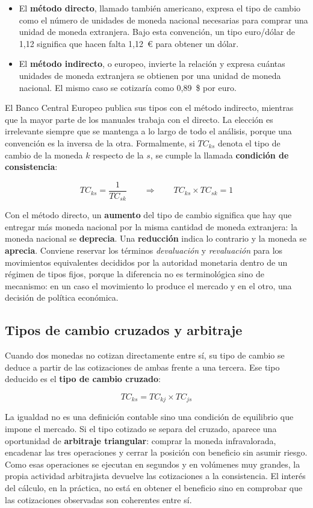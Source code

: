 \begin{itemize}
    \item El \textbf{método directo}, llamado también americano, expresa el tipo
    de cambio como el número de unidades de moneda nacional necesarias para
    comprar una unidad de moneda extranjera. Bajo esta convención, un tipo
    euro/dólar de 1,12 significa que hacen falta 1,12~\euro{} para obtener un
    dólar.
    \item El \textbf{método indirecto}, o europeo, invierte la relación y expresa
    cuántas unidades de moneda extranjera se obtienen por una unidad de moneda
    nacional. El mismo caso se cotizaría como 0,89~\$ por euro.
\end{itemize}

El Banco Central Europeo publica sus tipos con el método indirecto, mientras que
la mayor parte de los manuales trabaja con el directo. La elección es
irrelevante siempre que se mantenga a lo largo de todo el análisis, porque una
convención es la inversa de la otra. Formalmente, si $TC_{ks}$ denota el tipo de
cambio de la moneda $k$ respecto de la $s$, se cumple la llamada
\textbf{condición de consistencia}:

\[
TC_{ks} = \frac{1}{TC_{sk}}
\qquad\Longrightarrow\qquad
TC_{ks} \times TC_{sk} = 1
\]

Con el método directo, un \textbf{aumento} del tipo de cambio significa que hay
que entregar más moneda nacional por la misma cantidad de moneda extranjera: la
moneda nacional se \textbf{deprecia}. Una \textbf{reducción} indica lo contrario
y la moneda se \textbf{aprecia}. Conviene reservar los términos
\emph{devaluación} y \emph{revaluación} para los movimientos equivalentes
decididos por la autoridad monetaria dentro de un régimen de tipos fijos, porque
la diferencia no es terminológica sino de mecanismo: en un caso el movimiento lo
produce el mercado y en el otro, una decisión de política económica.

\subsection{Tipos de cambio cruzados y arbitraje}

Cuando dos monedas no cotizan directamente entre sí, su tipo de cambio se deduce
a partir de las cotizaciones de ambas frente a una tercera. Ese tipo deducido es
el \textbf{tipo de cambio cruzado}:

\[
TC_{ks} = TC_{kj} \times TC_{js}
\]

La igualdad no es una definición contable sino una condición de equilibrio que
impone el mercado. Si el tipo cotizado se separa del cruzado, aparece una
oportunidad de \textbf{arbitraje triangular}: comprar la moneda infravalorada,
encadenar las tres operaciones y cerrar la posición con beneficio sin asumir
riesgo. Como esas operaciones se ejecutan en segundos y en volúmenes muy
grandes, la propia actividad arbitrajista devuelve las cotizaciones a la
consistencia. El interés del cálculo, en la práctica, no está en obtener el
beneficio sino en comprobar que las cotizaciones observadas son coherentes entre
sí.

